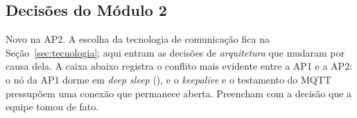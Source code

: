 \subsection*{Decisões do Módulo 2}
{}

\begin{orientacao}
Novo na AP2. A escolha da tecnologia de comunicação fica na
Seção~\ref{sec:tecnologia}; aqui entram as decisões de
\emph{arquitetura} que mudaram por causa dela. A caixa abaixo registra
o conflito mais evidente entre a AP1 e a AP2: o nó da AP1 dorme em
\emph{deep sleep} (), e o \emph{keepalive} e o testamento do MQTT
pressupõem uma conexão que permanece aberta. Preencham com a decisão
que a equipe tomou de fato.
\end{orientacao}

